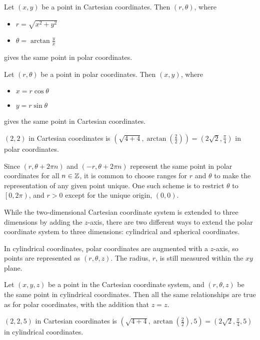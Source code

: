 \begin{thm}
    Let $(x, y)$ be a point in Cartesian coordinates. Then $(r, \theta)$, where
    \begin{itemize}
        \item $r = \sqrt{x^2 + y^2}$
        \item $\theta = \arctan\frac{y}{x}$
    \end{itemize} gives the same point in polar coordinates.
\end{thm}

\begin{thm}
    Let $(r, \theta)$ be a point in polar coordinates. Then $(x, y)$, where
    \begin{itemize}
        \item $x = r\cos\theta$
        \item $y = r\sin\theta$
    \end{itemize} gives the same point in Cartesian coordinates.
\end{thm}

\begin{exmp}
    $(2, 2)$ in Cartesian coordinates is $(\sqrt{4 + 4}, \arctan(\frac{2}{2})) = (2\sqrt{2}, \frac{\pi}{4})$ in polar coordinates.
\end{exmp}

Since $(r, \theta + 2\pi{n})$ and $(-r, \theta + 2\pi{n})$ represent the same point in polar coordinates for all $n \in \mathbb{Z}$, it is common to choose ranges for $r$ and $\theta$ to make the representation of any given point unique. One such scheme is to restrict $\theta$ to $\left[0, 2\pi\right)$, and $r > 0$ except for the unique origin, $(0, 0)$.

While the two-dimensional Cartesian coordinate system is extended to three dimensions by adding the $z$-axis, there are two different ways to extend the polar coordinate system to three dimensions: cylindrical and spherical coordinates.

In cylindrical coordinates, polar coordinates are augmented with a $z$-axis, so points are represented as $(r, \theta, z)$. The radius, $r$, is still measured within the $xy$ plane.

Let $(x, y, z)$ be a point in the Cartesian coordinate system, and $(r, \theta, z)$ be the same point in cylindrical coordinates. Then all the same relationships are true as for polar coordinates, with the addition that $z = z$.

\begin{exmp}
    $(2, 2, 5)$ in Cartesian coordinates is $(\sqrt{4 + 4}, \arctan(\frac{2}{2}), 5) = (2\sqrt{2}, \frac{\pi}{4}, 5)$ in cylindrical coordinates.
\end{exmp}


